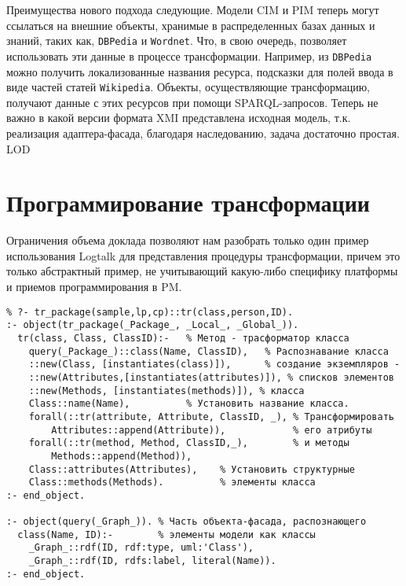 \documentclass[12pt]{article}
\begin{document}
Преимущества нового подхода следующие.  Модели CIM и PIM теперь могут ссылаться на внешние объекты, хранимые в распределенных базах данных и знаний, таких как, \texttt{DBPedia} и \texttt{Wordnet}.  Что, в свою очередь, позволяет использовать эти данные в процессе трансформации.  Например, из \texttt{DBPedia} можно получить локализованные названия ресурса, подсказки для полей ввода в виде частей статей \texttt{Wikipedia}.  Объекты, осуществляющие трансформацию, получают данные с этих ресурсов при помощи SPARQL-запросов.  Теперь не важно в какой версии формата XMI представлена исходная модель, т.к. реализация адаптера-фасада, благодаря наследованию, задача достаточно простая.  LOD %

\section{Программирование трансформации}

Ограничения объема доклада позволяют нам разобрать только один пример использования Logtalk для представления процедуры трансформации, причем это только абстрактный пример, не учитывающий какую-либо специфику платформы и приемов программирования в PM.
\begin{verbatim}
% ?- tr_package(sample,lp,cp)::tr(class,person,ID).
:- object(tr_package(_Package_, _Local_, _Global_)).
  tr(class, Class, ClassID):-   % Метод - трасформатор класса
    query(_Package_)::class(Name, ClassID),   % Распознавание класса
    ::new(Class, [instantiates(class)]),      % создание экземпляров -
    ::new(Attributes,[instantiates(attributes)]), % списков элементов
    ::new(Methods, [instantiates(methods)]), % класса
    Class::name(Name),          % Установить название класса.
    forall(::tr(attribute, Attribute, ClassID, _), % Трансформировать
        Attributes::append(Attribute)),            % его атрибуты
    forall(::tr(method, Method, ClassID,_),        % и методы
        Methods::append(Method)),
    Class::attributes(Attributes),    % Установить структурные
    Class::methods(Methods).          % элементы класса
:- end_object.

:- object(query(_Graph_)). % Часть объекта-фасада, распознающего
  class(Name, ID):-        % элементы модели как классы
    _Graph_::rdf(ID, rdf:type, uml:'Class'),
    _Graph_::rdf(ID, rdfs:label, literal(Name)).
:- end_object.
\end{verbatim}
\end{document}
